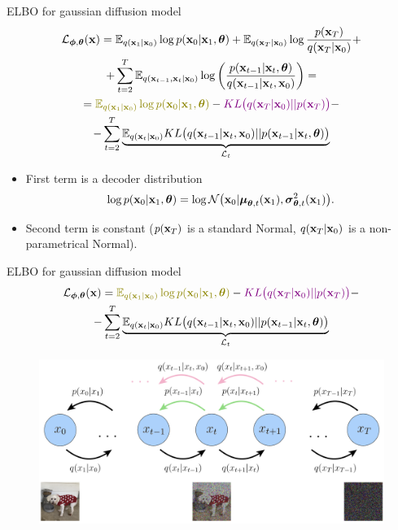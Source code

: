 \begin{frame}{ELBO for gaussian diffusion model}
		\vspace{-0.5cm}
		\begin{multline*}
			\cL_{\bphi, \btheta}(\bx) = \bbE_{q(\bx_1 | \bx_0)} \log p(\bx_0 | \bx_1, \btheta) + \bbE_{q(\bx_T | \bx_0)} \log \frac{p(\bx_T)}{q(\bx_T | \bx_0)} + \\
			  + \sum_{t=2}^T \bbE_{q(\bx_{t-1}, \bx_t | \bx_0)} \log \left( \frac{p(\bx_{t-1} | \bx_t, \btheta)}{q(\bx_{t-1}|\bx_{t}, \bx_0)}\right) =
			  \\ =  {\color{olive}\bbE_{q(\bx_1 | \bx_0)} \log p(\bx_0 | \bx_1, \btheta)} - {\color{violet}KL\bigl(q(\bx_T | \bx_0) || p(\bx_T)\bigr)} - \\
			- \sum_{t=2}^T \underbrace{ \bbE_{q(\bx_t | \bx_0)} KL \bigl(q(\bx_{t-1} | \bx_t, \bx_0) || p(\bx_{t - 1} | \bx_t, \btheta )\bigr)}_{\cL_t}
		\end{multline*}
		\vspace{-0.5cm}
	\begin{itemize}
		\item {\color{olive}First term} is a decoder distribution
		\[
			\log p(\mathbf{x}_0 | \mathbf{x}_1, \boldsymbol{\theta}) = \log \mathcal{N} \bigl(\mathbf{x}_0 | \boldsymbol{\mu}_{\boldsymbol{\theta}, t}(\mathbf{x}_1), \boldsymbol{\sigma}_{\boldsymbol{\theta}, t}^2(\mathbf{x}_1)\bigr).
		\] 
		\item {\color{violet}Second term} is constant ($p(\mathbf{x}_T)$ is a standard Normal, $q(\mathbf{x}_T | \mathbf{x}_0)$ is a non-parametrical Normal).
	\end{itemize}
\end{frame}
\begin{frame}{ELBO for gaussian diffusion model}
	\vspace{-0.5cm}
	\begin{multline*}
		\cL_{\bphi, \btheta}(\bx) =  {\color{olive}\bbE_{q(\bx_1 | \bx_0)} \log p(\bx_0 | \bx_1, \btheta)} - {\color{violet}KL\bigl(q(\bx_T | \bx_0) || p(\bx_T)\bigr)} - \\
		- \sum_{t=2}^T \underbrace{ \bbE_{q(\bx_t | \bx_0)} KL \bigl(q(\bx_{t-1} | \bx_t, \bx_0) || p(\bx_{t - 1} | \bx_t, \btheta )\bigr)}_{\cL_t}
	\end{multline*}
	
	\begin{figure}
		\includegraphics[width=0.85\linewidth]{figs/diffusion_objective}
	\end{figure}

\end{frame}

